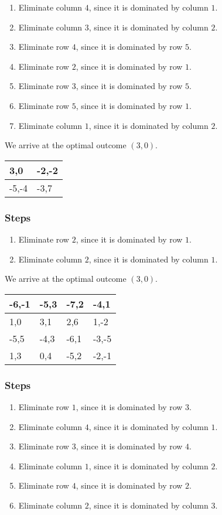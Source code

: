 \documentclass{article}
\begin{document}
\begin{enumerate}
\item Eliminate column $4$, since it is dominated by column $1$.
\item Eliminate column $3$, since it is dominated by column $2$.
\item Eliminate row $4$, since it is dominated by row $5$.
\item Eliminate row $2$, since it is dominated by row $1$.
\item Eliminate row $3$, since it is dominated by row $5$.
\item Eliminate row $5$, since it is dominated by row $1$.
\item Eliminate column $1$, since it is dominated by column $2$.
\end{enumerate}
We arrive at the optimal outcome $(3, 0)$.
\newpage
\begin{table}[]
\centering
\begin{tabular}{|l|l|}
\hline3,0 & -2,-2\\ \hline
-5,-4 & -3,7\\ \hline
\end{tabular}
\end{table}\subsubsection*{Steps}
\begin{enumerate}
\item Eliminate row $2$, since it is dominated by row $1$.
\item Eliminate column $2$, since it is dominated by column $1$.
\end{enumerate}
We arrive at the optimal outcome $(3, 0)$.
\newpage
\begin{table}[]
\centering
\begin{tabular}{|l|l|l|l|}
\hline-6,-1 & -5,3 & -7,2 & -4,1\\ \hline
1,0 & 3,1 & 2,6 & 1,-2\\ \hline
-5,5 & -4,3 & -6,1 & -3,-5\\ \hline
1,3 & 0,4 & -5,2 & -2,-1\\ \hline
\end{tabular}
\end{table}\subsubsection*{Steps}
\begin{enumerate}
\item Eliminate row $1$, since it is dominated by row $3$.
\item Eliminate column $4$, since it is dominated by column $1$.
\item Eliminate row $3$, since it is dominated by row $4$.
\item Eliminate column $1$, since it is dominated by column $2$.
\item Eliminate row $4$, since it is dominated by row $2$.
\item Eliminate column $2$, since it is dominated by column $3$.
\end{enumerate}
\end{document}
